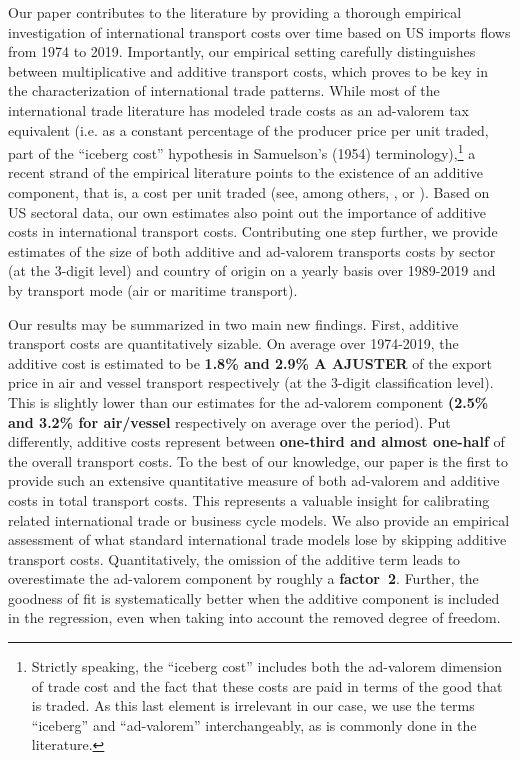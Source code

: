 \documentclass[a4paper,11pt]{article}
\begin{document}
Our paper contributes to the literature by providing a thorough empirical investigation of international transport costs over time based on US imports flows from 1974 to 2019. Importantly, our empirical setting carefully distinguishes between multiplicative and additive transport costs, which proves to be key in the characterization of international trade patterns. While most of the international trade literature has modeled trade costs as an ad-valorem tax equivalent (i.e. as a constant percentage of the producer price per unit traded, part of the ``iceberg cost'' hypothesis in Samuelson's (1954) terminology\cite{samuelson1954}),\footnote{Strictly speaking, the ``iceberg cost'' includes both the ad-valorem dimension of trade cost and the fact that these costs are paid in terms of the good that is traded.
As this last element is irrelevant in our case, we use the terms ``iceberg'' and ``ad-valorem'' interchangeably, as is commonly done in the literature.} a recent strand of the empirical literature points to the existence of an additive component, that is, a cost per unit traded (see, among others, \cite{Irrazabal_2015}, or \cite{martin2012}). Based on US sectoral data, our own estimates also point out the importance of additive costs in international transport costs. Contributing one step further, we provide estimates of the size of both additive and ad-valorem transports costs by sector (at the 3-digit level) and country of origin on a yearly basis over 1989-2019 and by transport mode (air or maritime transport).\smallskip


Our results may be summarized in two main new findings.
First, additive transport costs are quantitatively sizable.
On average over 1974-2019, the additive cost is estimated to be \textbf{1.8\% and 2.9\% A AJUSTER} of the export price in air and vessel transport respectively (at the 3-digit classification level). This is slightly lower than our estimates for the ad-valorem component \textbf{(2.5\% and 3.2\% for air/vessel} respectively on average over the period).
Put differently, additive costs represent between \textbf{one-third and almost one-half} of the overall transport costs. To the best of our knowledge, our paper is the first to provide such an extensive quantitative measure of both ad-valorem and additive costs in total transport costs.
This represents a valuable insight for calibrating related international trade or business cycle models.
We also provide an empirical assessment of what standard international trade models lose by skipping additive transport costs.
Quantitatively, the omission of the additive term leads to overestimate the ad-valorem component by roughly a \textbf{factor~2}. Further, the goodness of fit is systematically better when the additive component is included in the regression, even when taking into account the removed degree of freedom.\smallskip
\end{document}
